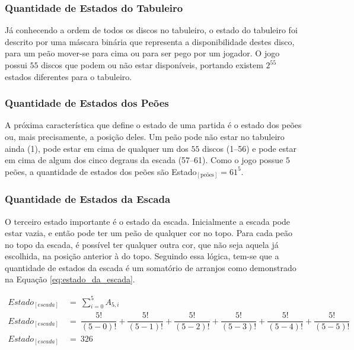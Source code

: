 \subsubsection{Quantidade de Estados do Tabuleiro}

Já conhecendo a ordem de todos os discos no tabuleiro, o estado do tabuleiro foi descrito por uma máscara binária que representa a disponibilidade destes disco, para um peão mover-se para cima ou para ser pego por um jogador. O jogo possui $55$ discos que podem ou não estar disponíveis, portando existem $2^{55}$ estados diferentes para o tabuleiro.

\subsubsection{Quantidade de Estados dos Peões}

A próxima característica que define o estado de uma partida é o estado dos peões ou, mais precisamente, a posição deles. Um peão pode não estar no tabuleiro ainda (1), pode estar em cima de qualquer um dos $55$ discos (1--56) e pode estar em cima de algum dos cinco degraus da escada (57--61). Como o jogo possue $5$ peões, a quantidade de estados dos peões são Estado$_{[\text{peões}]}=61^5$.

\subsubsection{Quantidade de Estados da Escada}

O terceiro estado importante é o estado da escada. Inicialmente a escada pode estar vazia, e então pode ter um peão de qualquer cor no topo. Para cada peão no topo da escada, é possível ter qualquer outra cor, que não seja aquela já escolhida, na posição anterior à do topo. Seguindo essa lógica, tem-se que a quantidade de estados da escada é um somatório de arranjos como demonstrado na Equação \ref{eq:estado_da_escada}.

\begin{equation} \label{eq:estado_da_escada} \tag{e.q. Estado da escada}
\begin{split}
	Estado_{[escada]}\ &=\ \displaystyle\sum_{i=0}^{5} A_{5,i}\\
	Estado_{[escada]}\ &=\ \dfrac{5!}{(5-0)!} + \dfrac{5!}{(5-1)!} + \dfrac{5!}{(5-2)!} + \dfrac{5!}{(5-3)!} + \dfrac{5!}{(5-4)!} + \dfrac{5!}{(5-5)!}\\
	Estado_{[escada]}\ &=\ 326
\end{split}
\end{equation}

